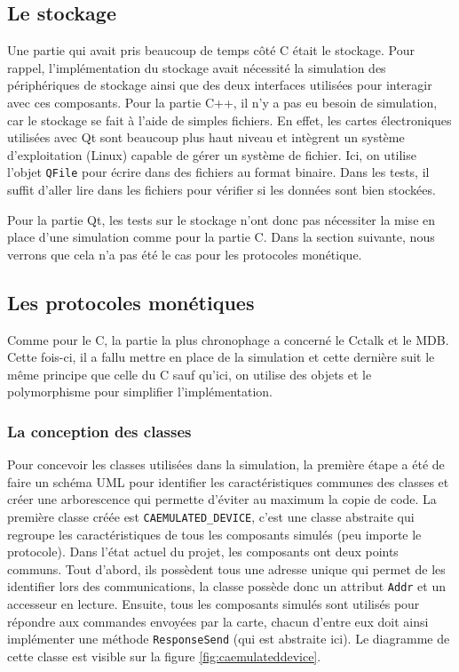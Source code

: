 \documentclass[a4paper]{article}
\begin{document}
\subsection{Le stockage}%

Une partie qui avait pris beaucoup de temps côté C était le stockage. Pour
rappel, l'implémentation du stockage avait nécessité la simulation des
périphériques de stockage ainsi que des deux interfaces utilisées pour interagir
avec ces composants. Pour la partie C++, il n'y a pas eu besoin de simulation,
car le stockage se fait à l'aide de simples fichiers. En effet, les cartes
électroniques utilisées avec Qt sont beaucoup plus haut niveau et intègrent un
système d'exploitation (Linux) capable de gérer un système de fichier. Ici, on
utilise l'objet \verb|QFile| pour écrire dans des fichiers au format binaire.
Dans les tests, il suffit d'aller lire dans les fichiers pour vérifier si les
données sont bien stockées.

Pour la partie Qt, les tests sur le stockage n'ont donc pas nécessiter la mise
en place d'une simulation comme pour la partie C. Dans la section suivante, nous
verrons que cela n'a pas été le cas pour les protocoles monétique.
\subsection{Les protocoles monétiques}%

Comme pour le C, la partie la plus chronophage a concerné le Cctalk et le MDB.
Cette fois-ci, il a fallu mettre en place de la simulation et cette dernière
suit le même principe que celle du C sauf qu'ici, on utilise des objets et le
polymorphisme pour simplifier l'implémentation.

\subsubsection{La conception des classes}

Pour concevoir les classes utilisées dans la simulation, la première étape a été
de faire un schéma UML pour identifier les caractéristiques communes des classes
et créer une arborescence qui permette d'éviter au maximum la copie de code. La
première classe créée est \verb|CAEMULATED_DEVICE|, c'est une classe abstraite
qui regroupe les caractéristiques de tous les composants simulés (peu importe le
protocole). Dans l'état actuel du projet, les composants ont deux points
communs. Tout d'abord, ils possèdent tous une adresse unique qui permet de les
identifier lors des communications, la classe possède donc un attribut
\verb|Addr| et un accesseur en lecture. Ensuite, tous les composants simulés
sont utilisés pour répondre aux commandes envoyées par la carte, chacun d'entre
eux doit ainsi implémenter une méthode \verb|ResponseSend| (qui est abstraite
ici). Le diagramme de cette classe est visible sur la figure
\ref{fig:caemulateddevice}.
\end{document}
